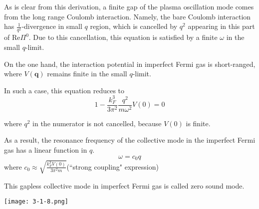 As is clear from this derivation, a finite gap of the plasma oscillation mode comes from the long range Coulomb interaction. Namely, the bare Coulomb interaction has $\frac{1}{q^2}$-divergence in small $q$ region, which is cancelled by $q^2$ appearing in this part of $\text{Re} \Pi^0$. Due to this cancellation, this equation is satisfied by a finite $\omega$ in the small $q$-limit.

On the one hand, the interaction potential in imperfect Fermi gas is short-ranged, where $V(\mathbf{q})$ remains finite in the small $q$-limit.

In such a case, this equation reduces to
\begin{equation} \label{Eqs3.2.14}
1 - \frac{k_F^3}{3\pi^2} \frac{q^2}{m\omega^2} V(0) = 0
\end{equation}

where $q^2$ in the numerator is not cancelled, because $V(0)$ is finite.

As a result, the resonance frequency of the collective mode in the imperfect Fermi gas has a linear function in $q$.
\begin{equation} \label{Eqs3.2.15}
\omega = c_0 q
\end{equation}
where $c_0 \approx \sqrt{\frac{k_F^3V(0)}{3\pi^2 m}}$(``strong coupling" expression)

This gapless collective mode in imperfect Fermi gas is called zero sound mode.

\begin{center} \label{Fig3.1.8}
\texttt{[image: 3-1-8.png]}
\end{center}
